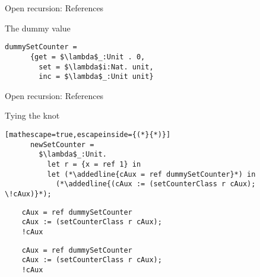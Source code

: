 \documentclass[presentation,xcolor=svgnames]{beamer}
\begin{document}
\begin{frame}[fragile]{Open recursion: References}
  \begin{block}{The dummy value}
    \begin{lstlisting}[mathescape=true]
      dummySetCounter =
      {get = $\lambda$_:Unit . 0,
        set = $\lambda$i:Nat. unit,
        inc = $\lambda$_:Unit unit}
    \end{lstlisting}
  \end{block}
\end{frame}

\begin{frame}[fragile]{Open recursion: References}
  \begin{block}{Tying the knot}
    \begin{lstlisting}[mathescape=true,escapeinside={(*}{*)}]
      newSetCounter =
        $\lambda$_:Unit.
          let r = {x = ref 1} in
          let (*\addedline{cAux = ref dummySetCounter}*) in
            (*\addedline{(cAux := (setCounterClass r cAux); \!cAux)}*);
    \end{lstlisting}
  \end{block}
\end{frame}


\begin{frame}[fragile]
  \begin{lstlisting}
    cAux = ref dummySetCounter
    cAux := (setCounterClass r cAux);
    !cAux
  \end{lstlisting}

  \begin{center}
  \end{center}
\end{frame}

\begin{frame}[fragile]
  \begin{lstlisting}
    cAux = ref dummySetCounter
    cAux := (setCounterClass r cAux);
    !cAux
  \end{lstlisting}

  \begin{center}
  \end{center}
\end{frame}
\end{document}
